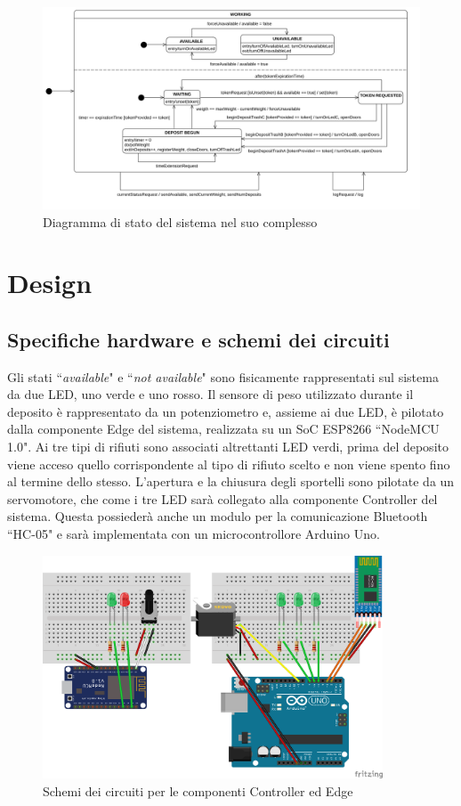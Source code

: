 \documentclass[a4paper, 12pt]{report}
\begin{document}
	\begin{figure}[H]
		\centering
		\includegraphics[width=\textwidth]{"img/SystemStatechart"}    
		\caption{Diagramma di stato del sistema nel suo complesso}
	\end{figure}
	\chapter{Design}
		\section{Specifiche hardware e schemi dei circuiti}
		Gli stati ``\textit{available}" e ``\textit{not available}" sono fisicamente rappresentati sul sistema da due LED,
		uno verde e uno rosso. Il sensore di peso utilizzato durante il deposito è
		rappresentato da un potenziometro e, assieme ai due LED, è pilotato dalla componente Edge del
		sistema, realizzata su un SoC ESP8266 ``NodeMCU 1.0".\newline
		Ai tre tipi di rifiuti sono associati altrettanti LED verdi, prima del deposito viene acceso
		quello corrispondente al tipo di rifiuto scelto e non viene spento fino al termine dello stesso.
		L'apertura e la chiusura degli sportelli sono pilotate da un servomotore, che come i tre LED
		sarà collegato alla componente Controller del sistema. Questa possiederà anche un modulo per la
		comunicazione Bluetooth ``HC-05" e sarà implementata con un microcontrollore Arduino Uno.
		\begin{figure}[H]
			\centering
			\includegraphics[width=0.9\textwidth]{"img/HardwareSchemas"}    
			\caption{Schemi dei circuiti per le componenti Controller ed Edge}
		\end{figure}
\end{document}
